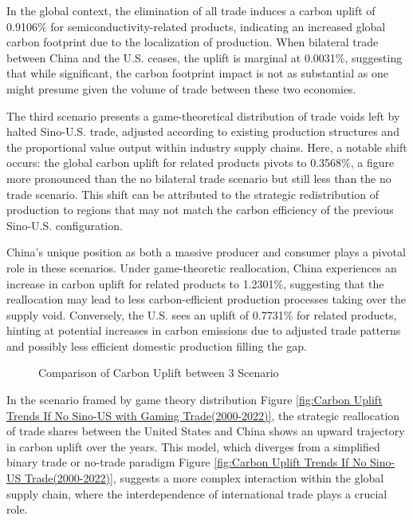 In the global context, the elimination of all trade induces a carbon uplift of 0.9106\% for semiconductivity-related products, indicating an increased global carbon footprint due to the localization of production. When bilateral trade between China and the U.S. ceases, the uplift is marginal at 0.0031\%, suggesting that while significant, the carbon footprint impact is not as substantial as one might presume given the volume of trade between these two economies.

The third scenario presents a game-theoretical distribution of trade voids left by halted Sino-U.S. trade, adjusted according to existing production structures and the proportional value output within industry supply chains. Here, a notable shift occurs: the global carbon uplift for related products pivots to 0.3568\%, a figure more pronounced than the no bilateral trade scenario but still less than the no trade scenario. This shift can be attributed to the strategic redistribution of production to regions that may not match the carbon efficiency of the previous Sino-U.S. configuration.

China's unique position as both a massive producer and consumer plays a pivotal role in these scenarios. Under game-theoretic reallocation, China experiences an increase in carbon uplift for related products to 1.2301\%, suggesting that the reallocation may lead to less carbon-efficient production processes taking over the supply void. Conversely, the U.S. sees an uplift of 0.7731\% for related products, hinting at potential increases in carbon emissions due to adjusted trade patterns and possibly less efficient domestic production filling the gap.
\ifincludefigures
\begin{figure}
  \centering
  \caption{Comparison of Carbon Uplift between 3 Scenario}\label{fig:Comparison of Carbon Uplift between 3 Scenario}
 \end{figure}
\fi
 In the scenario framed by game theory distribution Figure \ref{fig:Carbon Uplift Trends If No Sino-US with Gaming Trade(2000-2022)}, the strategic reallocation of trade shares between the United States and China shows an upward trajectory in carbon uplift over the years. This model, which diverges from a simplified binary trade or no-trade paradigm Figure \ref{fig:Carbon Uplift Trends If No Sino-US Trade(2000-2022)}, suggests a more complex interaction within the global supply chain, where the interdependence of international trade plays a crucial role.

